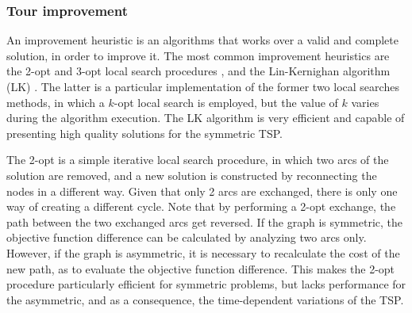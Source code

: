 \subsubsection{Tour improvement}

An improvement heuristic is an algorithms that works over a valid and complete solution, in order to improve it. The most common improvement heuristics are the 2-opt and 3-opt local search procedures \cite{lkh_original}, and the Lin-Kernighan algorithm (LK) . The latter is a particular implementation of the former two local searches methods, in which a $k$-opt local search is employed, but the value of $k$ varies during the algorithm execution. The LK algorithm is very efficient and capable of presenting high quality solutions for the symmetric TSP.

The 2-opt is a simple iterative local search procedure, in which two arcs of the solution are removed, and a new solution is constructed by reconnecting the nodes in a different way. Given that only 2 arcs are exchanged, there is only one way of creating a different cycle. Note that by performing a 2-opt exchange, the path between the two exchanged arcs get reversed. If the graph is symmetric, the objective function difference can be calculated by analyzing two arcs only. However, if the graph is asymmetric, it is necessary to recalculate the cost of the new path, as to evaluate the objective function difference. This makes the 2-opt procedure particularly efficient for symmetric problems, but lacks performance for the asymmetric, and as a consequence, the time-dependent variations of the TSP. 



